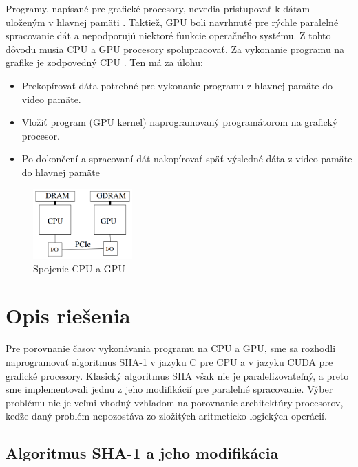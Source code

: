 \documentclass[conference]{IEEEtran}
\begin{document}
Programy, napísané pre grafické procesory, nevedia pristupovať k dátam uloženým v hlavnej pamäti \cite{gpuRowe}. Taktiež, GPU boli navrhnuté pre rýchle paralelné spracovanie dát a nepodporujú niektoré funkcie operačného systému. Z tohto dôvodu musia CPU a GPU procesory spolupracovať. Za vykonanie programu na grafike je zodpovedný CPU \cite{tatourian}. Ten má za úlohu:

\begin{itemize}
	\item{Prekopírovať dáta potrebné pre vykonanie programu z hlavnej pamäte do video pamäte.}
	\item{Vložiť program (GPU kernel) naprogramovaný programátorom na grafický procesor.}
	\item{Po dokončení a spracovaní dát nakopírovať späť výsledné dáta z video pamäte do hlavnej pamäte}
\end{itemize}

\begin{figure}[!h]
\centering
\includegraphics[width=1.5in]{img/CPU+GPU}
\caption{Spojenie CPU a GPU}
\end{figure}

\section{Opis riešenia}

Pre porovnanie časov vykonávania programu na CPU a GPU, sme sa rozhodli naprogramovať algoritmus SHA-1 v jazyku C pre CPU a v jazyku CUDA pre grafické procesory. Klasický algoritmus SHA však nie je paralelizovateľný, a preto sme implementovali jednu z jeho modifikácií pre paralelné spracovanie. Výber problému nie je veľmi vhodný vzhľadom na porovnanie architektúry procesorov, keďže daný problém nepozostáva zo zložitých aritmeticko-logických operácií.

\subsection{Algoritmus SHA-1 a jeho modifikácia}
\end{document}
